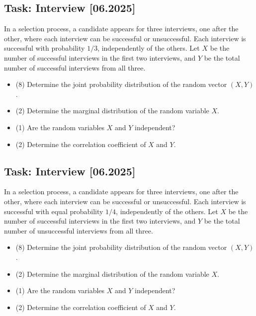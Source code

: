 \documentclass[a4paper, 12pt]{article}
\begin{document}
\subsection*{Task: Interview [06.2025]}

In a selection process, a candidate appears for three interviews, one after the other, where each interview can be successful or unsuccessful. Each interview is successful with probability $1/3$, independently of the others. Let $X$ be the number of successful interviews in the first two interviews, and $Y$ be the total number of successful interviews from all three.

\begin{itemize}
\item [a)] (8) Determine the joint probability distribution of the random vector $(X, Y)$.
\item [b)] (2) Determine the marginal distribution of the random variable $X$.
\item [c)] (1) Are the random variables $X$ and $Y$ independent?
\item [d)] (2) Determine the correlation coefficient of $X$ and $Y$.
\end{itemize}

\subsection*{Task: Interview [06.2025]}

In a selection process, a candidate appears for three interviews, one after the other, where each interview can be successful or unsuccessful. Each interview is successful with equal probability $1/4$, independently of the others. Let $X$ be the number of successful interviews in the first two interviews, and $Y$ be the total number of unsuccessful interviews from all three.

\begin{itemize}

\item [a)] (8) Determine the joint probability distribution of the random vector $(X, Y)$.
\item [b)] (2) Determine the marginal distribution of the random variable $X$.
\item [c)] (1) Are the random variables $X$ and $Y$ independent?
\item [d)] (2) Determine the correlation coefficient of $X$ and $Y$.

\end{itemize}
\end{document}

